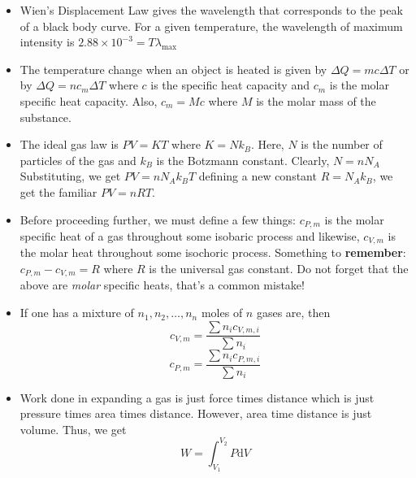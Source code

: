 \documentclass{scrartcl}
\begin{document}
\begin{itemize}
        \item Wien's Displacement Law gives the wavelength that corresponds to the peak of a black body curve. For a given temperature, the wavelength of maximum intensity is $\boxed{2.88\times10^{-3}=T\lambda_\max}$
        \item The temperature change when an object is heated is given by $\Delta Q=mc\Delta T$ or by $\Delta Q=nc_m\Delta T$ where $c$ is the specific heat capacity and $c_m$ is the molar specific heat capacity. Also, $c_m=Mc$ where $M$ is the molar mass of the substance.
        \item The ideal gas law is $PV=KT$ where $K=Nk_B$. Here, $N$ is the number of particles of the gas and $k_B$ is the Botzmann constant. Clearly, $N=nN_A$ Substituting, we get $PV=nN_Ak_BT$ defining a new constant $R=N_Ak_B$, we get the familiar $PV=nRT$.
        \item Before proceeding further, we must define a few things: $c_{P,m}$ is the molar specific heat of a gas throughout some isobaric process and likewise, $c_{V,m}$ is the molar heat throughout some isochoric process. Something to \textbf{remember}: $\boxed{c_{P,m}-c_{V,m}=R}$ where $R$ is the universal gas constant. Do not forget that the above are \textit{molar} specific heats, that's a common mistake!
        \item If one has a mixture of $n_1,n_2,\dots,n_n$ moles of $n$ gases are, then \[c_{V,m}=\frac{\sum n_ic_{V,m,i}}{\sum n_i}\]\[c_{P,m}=\frac{\sum n_ic_{P,m,i}}{\sum n_i}\]
        \item Work done in expanding a gas is just force times distance which is just pressure times area times distance. However, area time distance is just volume. Thus, we get \[W=\int_{V_1}^{V_2}P\mathrm dV\]
    \end{itemize}\newpage
\end{document}
